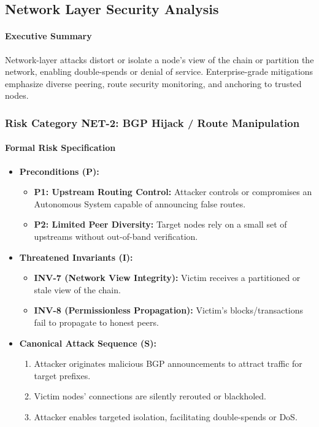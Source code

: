 \subsection{Network Layer Security Analysis}
\label{sec:results_network}

\paragraph{Executive Summary}
Network-layer attacks distort or isolate a node's view of the chain or partition the network, enabling double-spends or denial of service. Enterprise-grade mitigations emphasize diverse peering, route security monitoring, and anchoring to trusted nodes.

\subsubsection{Risk Category NET-2: BGP Hijack / Route Manipulation}

\paragraph{Formal Risk Specification}
\begin{itemize}
    \item \textbf{Preconditions (P):}
    \begin{itemize}
        \item \textbf{P1: Upstream Routing Control:} Attacker controls or compromises an Autonomous System capable of announcing false routes.
        \item \textbf{P2: Limited Peer Diversity:} Target nodes rely on a small set of upstreams without out-of-band verification.
    \end{itemize}
    \item \textbf{Threatened Invariants (I):}
    \begin{itemize}
        \item \textbf{INV-7 (Network View Integrity):} Victim receives a partitioned or stale view of the chain.
        \item \textbf{INV-8 (Permissionless Propagation):} Victim's blocks/transactions fail to propagate to honest peers.
    \end{itemize}
    \item \textbf{Canonical Attack Sequence (S):}
    \begin{enumerate}
        \item Attacker originates malicious BGP announcements to attract traffic for target prefixes.
        \item Victim nodes' connections are silently rerouted or blackholed.
        \item Attacker enables targeted isolation, facilitating double-spends or DoS.
    \end{enumerate}
\end{itemize}

